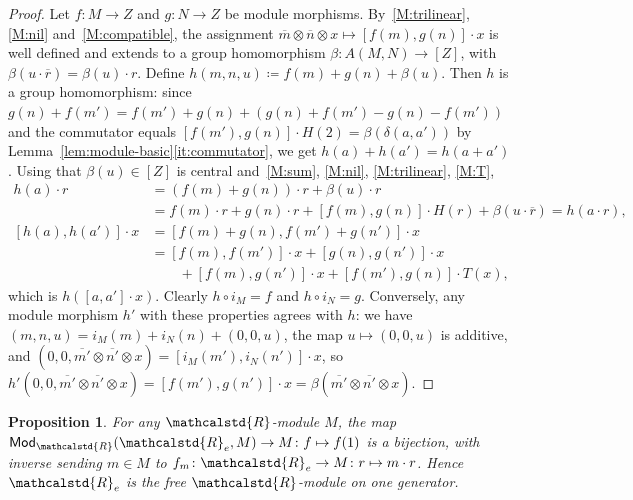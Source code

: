 \documentclass[reqno,a4paper]{amsart}
\theoremstyle{plain}
\newtheorem{proposition}[subsection]{Proposition}
\theoremstyle{definition}
\newcommand{\DefEq}{\coloneq}
\newcommand{\R}{\ensuremath{\mathcalstd{R}}}
\newcommand{\Mod}{\ensuremath{\mathsf{Mod}}}
\renewcommand{\Re}{\ensuremath{\R_{e}}}
\newcommand{\brk}[2]{\ensuremath{[#1,#2]}}
\begin{document}
\begin{proof}
  Let \(f\colon M\to Z\) and \(g\colon N\to Z\) be module morphisms. By~\ref{M:trilinear}, \ref{M:nil} and~\ref{M:compatible}, the assignment \(\overline{m}\otimes\overline{n}\otimes x\mapsto\brk{f(m)}{g(n)}\cdot x\) is well defined and extends to a group homomorphism \(\beta\colon A(M,N)\to[Z]\), with \(\beta(u\cdot\overline{r})=\beta(u)\cdot r\). Define \(h(m,n,u)\DefEq f(m)+g(n)+\beta(u)\). Then \(h\) is a group homomorphism: since \(g(n)+f(m')=f(m')+g(n)+(g(n)+f(m')-g(n)-f(m'))\) and the commutator equals \(\brk{f(m')}{g(n)}\cdot H(2)=\beta(\delta(a,a'))\) by Lemma~\ref{lem:module-basic}\ref{it:commutator}, we get \(h(a)+h(a')=h(a+a')\). Using that \(\beta(u)\in[Z]\) is central and~\ref{M:sum}, \ref{M:nil}, \ref{M:trilinear}, \ref{M:T},
  \begin{align*}
    h(a)\cdot r              & =(f(m)+g(n))\cdot r+\beta(u)\cdot r                                                               \\
                             & =f(m)\cdot r+g(n)\cdot r+\brk{f(m)}{g(n)}\cdot H(r)+\beta(u\cdot\overline{r})=h(a\cdot r)\text{,} \\
    \brk{h(a)}{h(a')}\cdot x & =\brk{f(m)+g(n)}{f(m')+g(n')}\cdot x                                                              \\
                             & =\brk{f(m)}{f(m')}\cdot x+\brk{g(n)}{g(n')}\cdot x                                                \\
                             & \qquad+\brk{f(m)}{g(n')}\cdot x+\brk{f(m')}{g(n)}\cdot T(x)\text{,}
  \end{align*}
  which is \(h(\brk{a}{a'}\cdot x)\). Clearly \(h\circ i_{M}=f\) and \(h\circ i_{N}=g\). Conversely, any module morphism \(h'\) with these properties agrees with \(h\): we have \((m,n,u)=i_{M}(m)+i_{N}(n)+(0,0,u)\), the map \(u\mapsto(0,0,u)\) is additive, and \((0,0,\overline{m'}\otimes\overline{n'}\otimes x)=\brk{i_{M}(m')}{i_{N}(n')}\cdot x\), so \(h'(0,0,\overline{m'}\otimes\overline{n'}\otimes x)=\brk{f(m')}{g(n')}\cdot x=\beta(\overline{m'}\otimes\overline{n'}\otimes x)\).
\end{proof}

\begin{proposition}\label{prop:free-rank-one}
  For any \(\R\)-module \(M\), the map \(\Mod_{\R}(\Re,M)\to M\colon {f\mapsto f(1)}\) is a bijection, with inverse sending \(m\in M\) to \(f_{m}\colon \Re\to M\colon r\mapsto m\cdot r\). Hence \(\Re\) is the free \(\R\)-module on one generator.
\end{proposition}
\end{document}
